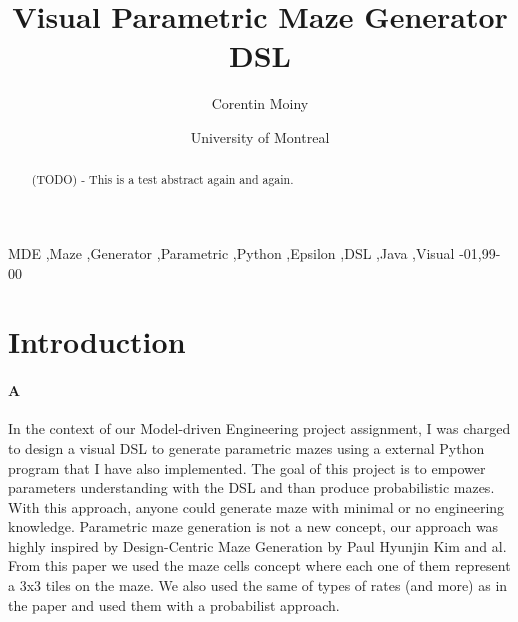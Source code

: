 \documentclass[review]{elsarticle}
\begin{document}
\begin{frontmatter}

\title{Visual Parametric Maze Generator DSL }

\author{Corentin Moiny}
\address{304, 5e Avenue Mailloux, La Pocatière. Quebec. Canada}

\author[mymainaddress]{University of Montreal}

\address[mymainaddress]{2900 Edouard Montpetit Blvd, Montreal, Quebec. Canada}

\begin{abstract}
(TODO) - This is a test abstract again and again.
\end{abstract}

\begin{keyword}
MDE \sep Maze \sep Generator \sep Parametric \sep Python \sep Epsilon \sep DSL \sep Java \sep Visual
-01\sep  99-00
\end{keyword}

\end{frontmatter}

\linenumbers

\section{Introduction}

\paragraph{A}
In the context of our Model-driven Engineering project assignment, I was charged to design a visual DSL to generate parametric mazes using a external Python program that I have also implemented. The goal of this project is to empower parameters understanding with the DSL and than produce probabilistic mazes. With this approach, anyone could generate maze with minimal or no engineering knowledge. Parametric maze generation is not a new concept, our approach was highly inspired by Design-Centric Maze Generation by Paul Hyunjin Kim and al\cite{kim_design-centric_2019}. From this paper we used the maze cells concept where each one of them represent a 3x3 tiles on the maze. We also used the same of types of rates (and more) as in the paper and used them with a probabilist approach. 
\end{document}
